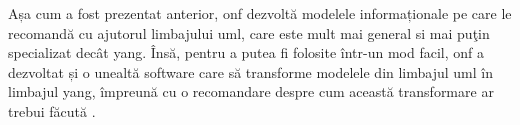 Așa cum a fost prezentat anterior, \gls{onf} dezvoltă modelele informaționale pe care le recomandă cu ajutorul limbajului \gls{uml}, care este mult mai general si mai puţin specializat decât \gls{yang}. Însă, pentru a putea fi folosite într-un mod facil, \gls{onf} a dezvoltat și o unealtă software care să transforme modelele din limbajul \gls{uml} în limbajul \gls{yang}, împreună cu o recomandare despre cum această transformare ar trebui făcută \cite{onftr531}.